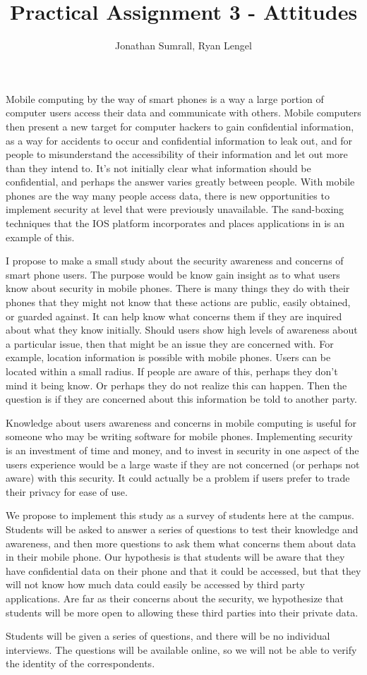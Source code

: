 \documentclass[]{apa}
\affiliation{1DV200}
\author{Jonathan Sumrall, Ryan Lengel}
\title{Practical Assignment 3 - Attitudes }
\begin{document}
\doublespace
\maketitle{}

Mobile computing by the way of smart phones is a way a large portion of computer users access their data and communicate with others. Mobile computers then present a new target for computer hackers to gain confidential information, as a way for accidents to occur and confidential information to leak out, and for people to misunderstand the accessibility of their information and let out more than they intend to. It's not initially clear what information should be confidential, and perhaps the answer varies greatly between people. With mobile phones are the way many people access data, there is new opportunities to implement security at level that were previously unavailable. The sand-boxing techniques that the IOS platform incorporates and places applications in is an example of this. 

I propose to make a small study about the security awareness and concerns of smart phone users. The purpose would be know gain insight as to what users know about security in mobile phones. There is many things they do with their phones that they might not know that these actions are public, easily obtained, or guarded against. It can help know what concerns them if they are inquired about what they know initially. Should users show high levels of awareness about a particular issue, then that might be an issue they are concerned with. For example, location information is possible with mobile phones. Users can be located within a small radius. If people are aware of this, perhaps they don't mind it being know. Or perhaps they do not realize this can happen. Then the question is if they are concerned about this information be told to another party. 

Knowledge about users awareness and concerns in mobile computing is useful for someone who may be writing software for mobile phones. Implementing security is an investment of time and money, and to invest in security in one aspect of the users experience would be a large waste if they are not concerned (or perhaps not aware) with this security. It could actually be a problem if users prefer to trade their privacy for ease of use. 

We propose to implement this study as a survey of students here at the campus. Students will be asked to answer a series of questions to test their knowledge and awareness, and then more questions to ask them what concerns them about data in their mobile phone. Our hypothesis is that students will be aware that they have confidential data on their phone and that it could be accessed, but that they will not know how much data could easily be accessed by third party applications. Are far as their concerns about the security, we hypothesize that students will be more open to allowing these third parties into their private data. 

Students will be given a series of questions, and there will be no individual interviews. The questions will be available online, so we will not be able to verify the identity of the correspondents. 
\end{document}
